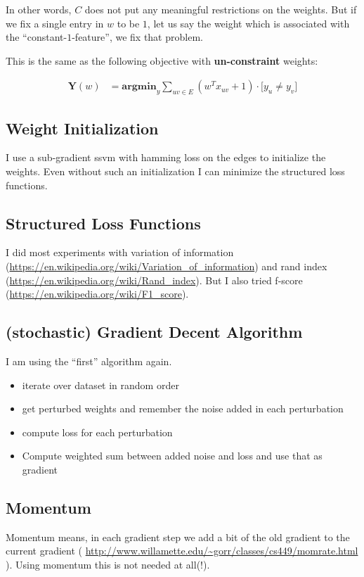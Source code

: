 \documentclass{article}
\begin{document}
In other words, $C$ does not put any meaningful restrictions on the weights.
But if we fix a single entry in $w$ to be $1$, let us say the weight which is associated with the ``constant-$1$-feature'',
we fix that problem.

This is the same as the following objective with \textbf{un-constraint} weights:

\begin{align*}
    \textbf{Y}(w) & =   
        \textbf{argmin}_{y} 
                \sum_{ uv \in E} 
                    ( w^Tx_{uv} + 1)\cdot \big[ y_u \neq y_v \big] 
\end{align*}



\subsection{Weight Initialization}

I use a sub-gradient ssvm with hamming loss on the edges to
initialize the weights.
Even without such an initialization I can minimize the structured loss
functions.

\subsection{Structured Loss Functions}
I did most experiments with 
variation of information (\url{https://en.wikipedia.org/wiki/Variation_of_information})
and rand index (\url{https://en.wikipedia.org/wiki/Rand_index}).
But I also tried f-score (\url{https://en.wikipedia.org/wiki/F1_score}).

\subsection{(stochastic) Gradient Decent Algorithm}

I am using the ``first'' algorithm again.
\begin{itemize}
\item iterate over dataset in random order
\item get perturbed weights and remember the noise added in each perturbation
\item compute loss for each perturbation
\item Compute weighted sum between added noise and loss
and use that as gradient
\end{itemize}

\subsection{Momentum}

Momentum means, in each gradient step we add a bit of the
old gradient to the current gradient (
\url{http://www.willamette.edu/~gorr/classes/cs449/momrate.html} ).
Using momentum this is not needed at all(!).
\end{document}
